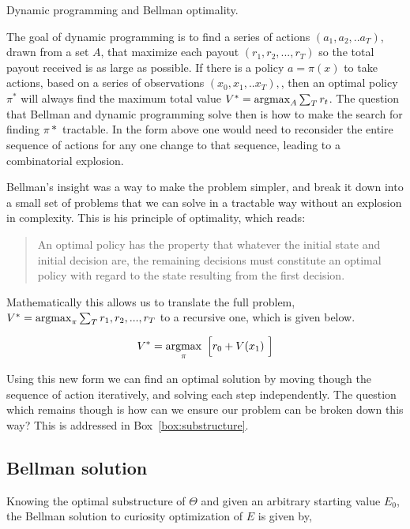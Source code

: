 \begin{featurebox}
	\caption{Dynamic programming and Bellman optimality.}
	\label{box:bellman}
	The goal of dynamic programming is to find a series of actions $(a_1, a_2, ..a_T)$, drawn from a set $A$, that maximize each payout $(r_1, r_2, ..., r_{T})$ so the total payout received is as large as possible. If there is a policy $a = \pi(x)$ to take actions, based on a series of observations $(x_0, x_1, ..x_{T}),$, then an optimal policy $\pi^*$ will always find the maximum total value $V^* = \operatorname*{argmax}_{A} \sum_T r_t $. The question that Bellman and dynamic programming solve then is how to make the search for finding $\pi*$ tractable. In the form above one would need to reconsider the entire sequence of actions for any one change to that sequence, leading to a combinatorial explosion. 
	
	Bellman's insight was a way to make the problem simpler, and break it down into a small set of problems that we can solve in a tractable way without an explosion in complexity. This is his principle of optimality, which reads:

	\begin{quote}
		An optimal policy has the property that whatever the initial state and initial decision are, the remaining decisions must constitute an optimal policy with regard to the state resulting from the first decision. \citep{Bellmann1954}
	\end{quote}

	Mathematically this allows us to translate the full problem, $V^* = \operatorname*{argmax}_{\pi} \sum_T r_1, r_2, ..., r_{T}$ to a recursive one, which is given below. 

	\begin{equation}
		V^* = \operatorname*{argmax}_{\pi} \ \Big [ r_0 + V(x_1) \ \Big ]
	\end{equation}
	
	Using this new form we can find an optimal solution by moving though the sequence of action iteratively, and solving each step independently. The question which remains though is how can we ensure our problem can be broken down this way? This is addressed in Box~\ref{box:substructure}.
	\medskip
\end{featurebox}


\subsection*{Bellman solution} Knowing the optimal substructure of $\Theta$ and given an arbitrary starting value $E_0$, the Bellman solution to curiosity optimization of $E$ is given by,

